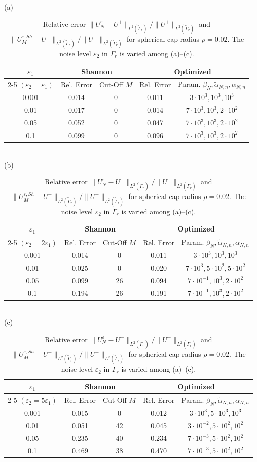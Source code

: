 \documentclass[a4paper, 10pt]{article}
\numberwithin{equation}{section}
\theoremstyle{definition}
\begin{document}
\begin{table}
   (a) \,\,\begin{tabular}{ | c || c | c || c | c | }
   \hline
	$\varepsilon_1$ & \multicolumn{2}{|c||}{Shannon} &\multicolumn{2}{|c|}{Optimized}\\ \cline{2-5}
	$(\varepsilon_2=\varepsilon_1)$ &  Rel. Error & Cut-Off $M$ & Rel. Error & Param. $\beta_N,\tilde{\alpha}_{N,n},\alpha_{N,n}$\\\hline
  0.001& 0.014 & 0 & 0.011 &  $3\cdot 10^3, 10^3, 10^3$\\
  0.01 & 0.017& 0 & 0.014 & $7\cdot 10^3, 10^3, 2\cdot 10^2$\\
	0.05 & 0.052 & 0 & 0.047 & $7\cdot 10^3, 10^3, 2\cdot 10^2$ \\
	0.1 & 0.099 & 0 & 0.096& $7\cdot 10^3, 10^3, 2\cdot 10^2$\\
	\hline
\end{tabular}\\[2ex]
 (b) \,\,\begin{tabular}{ | c || c | c || c | c | }
   \hline
	$\varepsilon_1$ & \multicolumn{2}{|c||}{Shannon} &\multicolumn{2}{|c|}{Optimized}\\ \cline{2-5}
	$(\varepsilon_2=2\varepsilon_1)$ &  Rel. Error & Cut-Off $M$ & Rel. Error & Param. $\beta_N,\tilde{\alpha}_{N,n},\alpha_{N,n}$\\\hline
  0.001 & 0.014 & 0 & 0.011& $3\cdot 10^3, 10^3, 10^3$\\
  0.01 & 0.025 & 0 & 0.020& $7\cdot 10^3, 5\cdot 10^2, 5\cdot 10^2$\\
	0.05 & 0.099 & 26 & 0.094 & $7\cdot 10^{-1}, 10^3, 2\cdot 10^2$ \\
	0.1 & 0.194 & 26 & 0.191& $7\cdot 10^{-1}, 10^3, 2\cdot 10^2$\\
	\hline
\end{tabular}\\[2ex]
 (c) \,\,\begin{tabular}{ | c || c | c || c | c | }
   \hline
	$\varepsilon_1$ & \multicolumn{2}{|c||}{Shannon} &\multicolumn{2}{|c|}{Optimized}\\ \cline{2-5}
	$(\varepsilon_2=5\varepsilon_1)$ &  Rel. Error & Cut-Off $M$ & Rel. Error & Param. $\beta_N,\tilde{\alpha}_{N,n},\alpha_{N,n}$\\\hline
  0.001 & 0.015 & 0 & 0.012& $3\cdot 10^3, 5\cdot10^3, 10^3$\\
  0.01 & 0.051 & 42 & 0.045& $3\cdot 10^{-2}, 5\cdot 10^2, 10^2$\\
	0.05 & 0.235 & 40 & 0.234 & $7\cdot 10^{-3}, 5\cdot 10^2, 10^2$ \\
	0.1 & 0.469 & 38 & 0.470 & $7\cdot 10^{-3}, 5\cdot 10^2, 10^2$\\
	\hline
\end{tabular}

\caption{Relative error $\|U_N^\varepsilon-U^+\|_{L^2(\tilde{\Gamma}_r)}/\|U^+\|_{L^2(\tilde{\Gamma}_r)}$ and $\|U_M^{\varepsilon,Sh}-U^+\|_{L^2(\tilde{\Gamma}_r)}/\|U^+\|_{L^2(\tilde{\Gamma}_r)}$ for spherical cap radius $\rho=0.02$.  The noise level $\varepsilon_2$ in $\Gamma_r$ is varied among (a)--(c).}\label{tab:err2}
\end{table}
\end{document}
